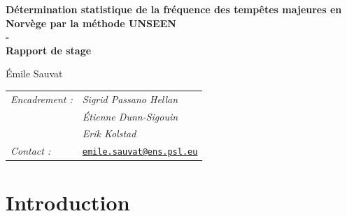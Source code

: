 \documentclass[a4paper, 10pt, twoside]{article}
\begin{document}




    \thispagestyle{empty}


    \begin{minipage}{0.9\textwidth}
        \centering
        \textbf{\huge Détermination statistique de la fréquence des tempêtes majeures en Norvège par la méthode UNSEEN \\ 
        - \vspace{0.37cm} \\ 
        Rapport de stage}
        \vspace{4cm}
    \end{minipage}
    
    \vspace{0.5cm}
    
    \begin{center}
        {\large Émile Sauvat \vspace{10pt} \\ 
        \begin{table}[htbp]
            \centering
            \begin{tabular}{ll}
                \textit{Encadrement :} & \textit{Sigrid Passano Hellan} \\
                & \textit{Étienne Dunn-Sigouin} \\
                & \textit{Erik Kolstad} \\
                \textit{Contact :} & \href{mailto:emile.sauvat@ens.psl.eu}{\texttt{emile.sauvat@ens.psl.eu}}
            \end{tabular}
        \end{table}
        }
    \end{center}
    
    \newpage
        
        \setcounter{tocdepth}{3}
    \tableofcontents   
        
    \listoffigures 
    
    \section*{Introduction}


    \newpage
    \nocite{*}
    \printbibliography[title = Bibliographie]

    
\end{document}

